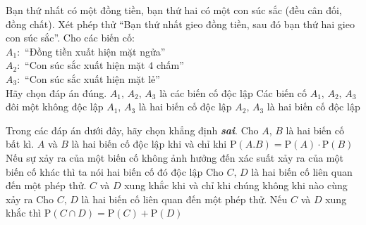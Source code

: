 \begin{ex}%
	Bạn thứ nhất có một đồng tiền, bạn thứ hai có một con súc sắc (đều cân đối, đồng chất). Xét phép thử ``Bạn thứ nhất gieo đồng tiền, sau đó bạn thứ hai gieo con súc sắc''.  Cho các biến cố:\\
	$A_1:$ ``Đồng tiền xuất hiện mặt ngửa''\\
	$A_2:$ ``Con súc sắc xuất hiện mặt $4$ chấm''\\
	$A_3:$ ``Con súc sắc xuất hiện mặt lẻ''\\
	Hãy chọn đáp án đúng.
	\choice
	{$A_1,\,A_2,\,A_3$ là các biến cố độc lập }
	{Các biến cố $A_1,\,A_2,\,A_3$ đôi một không độc lập }
	{\True $A_1,\,A_3$ là hai biến cố độc lập}
	{$A_2,\,A_3$ là hai biến cố độc lập}
\end{ex}
\begin{ex}%
	Trong các đáp án dưới đây, hãy chọn khẳng định \textbf{\textit{sai}}.
	\choice
	{Cho $A$, $B$ là hai biến cố bất kì.   $A$ và $B$ là hai biến cố độc lập khi và chỉ khi $\mathrm{P}(A.B)=\mathrm{P}(A)\cdot \mathrm{P}(B)$}
	{Nếu sự xảy ra của một biến cố không ảnh hưởng đến xác suất xảy ra của một biến cố khác thì ta nói hai biến cố đó độc lập}
	{Cho $C,\, D$ là hai biến cố liên quan đến một phép thử. $C$ và $D$ xung khắc khi và chỉ khi chúng không khi nào cùng xảy ra }
	{\True Cho $C,\, D$ là hai biến cố liên quan đến một phép thử. Nếu $C$ và $D$ xung khắc thì $\mathrm{P}(C\cap D)=\mathrm{P}(C)+\mathrm{P}(D)$}
\end{ex}

